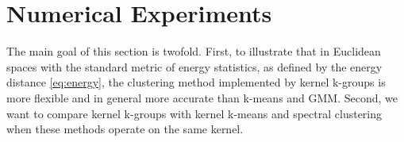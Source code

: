 \documentclass[10pt,journal,compsoc]{IEEEtran}
\begin{document}
%


\section{Numerical Experiments}
\label{sec:numerics}

The main goal of this section is twofold. 
First, to illustrate that in Euclidean spaces with the standard
metric of energy statistics, as defined by the energy 
distance \eqref{eq:energy}, the
clustering method implemented by kernel k-groups
is more flexible and in general more accurate than
k-means and GMM.
Second, we want to compare kernel k-groups with kernel k-means
and spectral clustering when these methods
operate on the same kernel.
\end{document}
